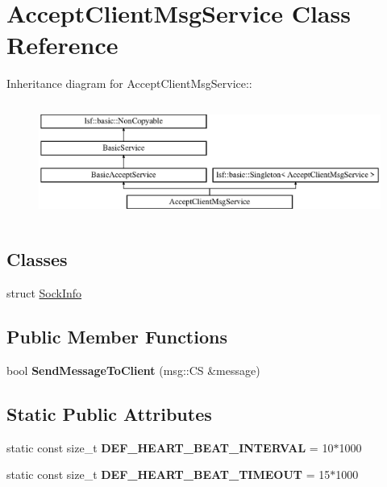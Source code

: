 \hypertarget{classAcceptClientMsgService}{
\section{AcceptClientMsgService Class Reference}
\label{classAcceptClientMsgService}
}
Inheritance diagram for AcceptClientMsgService::\begin{figure}[H]
\begin{center}
\leavevmode
\includegraphics[height=3.8488cm]{classAcceptClientMsgService}
\end{center}
\end{figure}
\subsection*{Classes}
\begin{DoxyCompactItemize}
\item 
struct \hyperlink{structAcceptClientMsgService_1_1SockInfo}{SockInfo}
\end{DoxyCompactItemize}
\subsection*{Public Member Functions}
\begin{DoxyCompactItemize}
\item 
\hypertarget{classAcceptClientMsgService_a476a0dcc9bcc0e87b13b7d5d9d498a65}{
bool {\bfseries SendMessageToClient} (msg::CS \&message)}
\label{classAcceptClientMsgService_a476a0dcc9bcc0e87b13b7d5d9d498a65}

\end{DoxyCompactItemize}
\subsection*{Static Public Attributes}
\begin{DoxyCompactItemize}
\item 
\hypertarget{classAcceptClientMsgService_ae4eabfbc083e47f7ef0088a2cfd5a680}{
static const size\_\-t {\bfseries DEF\_\-HEART\_\-BEAT\_\-INTERVAL} = 10$\ast$1000}
\label{classAcceptClientMsgService_ae4eabfbc083e47f7ef0088a2cfd5a680}

\item 
\hypertarget{classAcceptClientMsgService_ab9f8101eab332c07ed56f0fbf363978e}{
static const size\_\-t {\bfseries DEF\_\-HEART\_\-BEAT\_\-TIMEOUT} = 15$\ast$1000}
\label{classAcceptClientMsgService_ab9f8101eab332c07ed56f0fbf363978e}

\end{DoxyCompactItemize}
